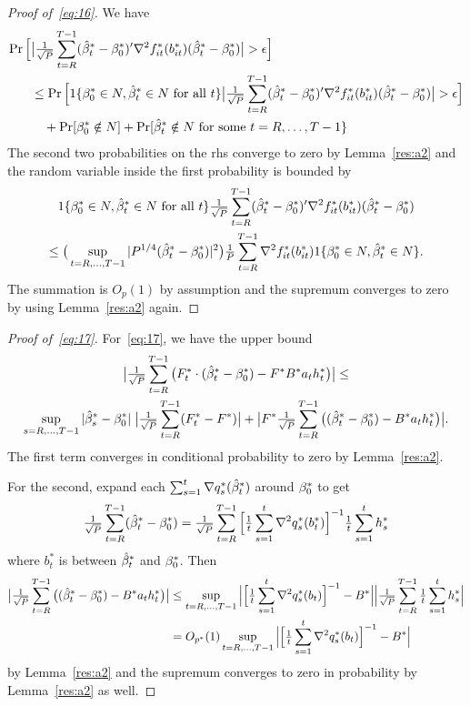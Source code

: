 \documentclass[12pt,fleqn]{article}
\begin{document}
\begin{proof}[Proof of~\eqref{eq:16}]
We have
\begin{align*}
  \pr\Big[& \big|\oclt{t} (\bh_t^* - \btrue^*)' \nabla^2 f_{it}^*(b_{it}^*) (\bh_t^* - \btrue^*) \big| > \epsilon \Big] \\
  &\leq \pr\Big[1\{\btrue^* \in N, \bh_t^* \in N\ \text{for all}\ t\} \big|\oclt{t} (\bh_t^* - \btrue^*)' \nabla^2 f_{it}^*(b_{it}^*) (\bh_t^* - \btrue^*) \big| > \epsilon \Big] \\
  &\quad + \pr[\btrue^* \notin N] + \pr[\bh_t^* \notin N\ \text{for some}\ t = R,\dots,T-1\}
\end{align*}
The second two probabilities on the rhs converge to zero by
Lemma~\ref{res:a2} and the random variable inside the first probability is bounded by
\begin{multline*}
  1\{\beta_0^* \in N, \hat \beta_t^* \in N\ \text{for all}\ t\}
  \tfrac{1}{\sqrt{P}} \sum_{t=R}^{T-1} (\hat \beta_t^* - \beta_0^*)' \nabla^2 f_{it}^*(b_{it}^*) (\hat \beta_t^* - \beta_0^*)
  \\ \leq
  \big(\sup_{t=R,\dots,T-1} |P^{1/4}(\hat \beta_t^* - \beta_0^*)|^2\big) \tfrac{1}{P} \sum_{t=R}^{T-1}  \nabla^2 f_{it}^*(b_{it}^*) 1\{\beta_0^* \in N, \hat \beta_t^* \in N\}.
\end{multline*}
The summation is $O_p(1)$ by assumption and the supremum converges to
zero by using Lemma~\ref{res:a2} again.
\end{proof}
\begin{proof}[Proof of~\eqref{eq:17}]
For~\eqref{eq:17}, we have the upper bound
\begin{multline*}
  \big\lvert \tfrac{1}{\sqrt{P}} \sum_{t=R}^{T-1} \big(F_t^* \cdot (\hat \beta_t^* - \beta_0^*) - F^* B^* a_t h_t^*\big) \big\rvert \leq \\
   \sup_{s=R,\dots,T-1} |\hat \beta_s^* - \beta_0^*|\; \big\lvert \tfrac{1}{\sqrt{P}} \sum_{t=R}^{T-1} (F_t^* - F^*) \big\rvert
  + \big\lvert F^* \tfrac{1}{\sqrt{P}} \sum_{t=R}^{T-1} \big((\hat \beta_t^* - \beta_0^*) - B^* a_t h_t^*\big) \big\rvert.
\end{multline*}
The first term converges in conditional probability to zero by
Lemma~\ref{res:a2}.

For the second, expand each $\sum_{s=1}^t \nabla q_s^*(\hat \beta_t^*)$
around $\beta_0^*$ to get
\begin{equation*}
  \tfrac{1}{\sqrt{P}} \sum_{t=R}^{T-1} (\hat \beta_t^* - \beta_0^*)
  = \tfrac{1}{\sqrt{P}} \sum_{t=R}^{T-1} \Big[\tfrac{1}{t} \sum_{s=1}^t \nabla^2 q_s^*(b_t^*)\Big]^{-1} \tfrac{1}{t} \sum_{s=1}^t h_s^*
\end{equation*}
where $b_t^*$ is between $\hat \beta_t^*$ and $\beta_0^*$. Then
\begin{align*}
  \big\lvert \tfrac{1}{\sqrt{P}} \sum_{t=R}^{T-1} \big((\hat \beta_t^* - \beta_0^*) - B^* a_t h_t^*\big) \big\rvert
  &\leq \sup_{t=R,\dots,T-1} \Big\lvert\Big[\tfrac{1}{t} \sum_{s=1}^t \nabla^2 q_s^*(b_t)\Big]^{-1} - B^*\Big\rvert
  \Big\lvert\tfrac{1}{\sqrt{P}} \sum_{t=R}^{T-1} \tfrac{1}{t} \sum_{s=1}^t h_s^* \Big\rvert \\
  &= O_{p^*}(1) \sup_{t=R,\dots,T-1} \Big\lvert\Big[\tfrac{1}{t} \sum_{s=1}^t \nabla^2 q_s^*(b_t)\Big]^{-1} - B^*\Big\rvert
\end{align*}
by Lemma~\ref{res:a2} and the supremum converges to zero in
probability by Lemma~\ref{res:a2} as well.
\end{proof}
\end{document}
